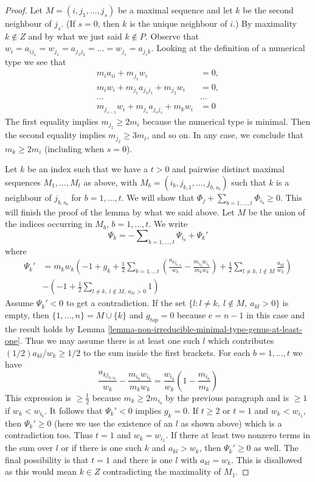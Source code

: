 \begin{proof}
\medskip\noindent
Let $M = (i, j_1, \ldots, j_s)$ be a maximal sequence and let
$k$ be the second neighbour of $j_s$. (If $s = 0$, then $k$
is the unique neighbour of $i$.) By maximality $k \not \in Z$
and by what we just said $k \not \in P$. Observe that
$w_i = a_{ij_1} = w_{j_1} = a_{j_1j_2} = \ldots = w_{j_s} =
a_{j_sk}$. Looking at the definition
of a numerical type we see that
\begin{align*}
m_ia_{ii} + m_{j_1}w_i & = 0,\\
m_iw_i + m_{j_1}a_{j_1j_1} + m_{j_2}w_i & = 0,\\
\ldots & \ldots \\
m_{j_{s - 1}}w_i + m_{j_s}a_{j_sj_s} + m_kw_i & = 0
\end{align*}
The first equality implies $m_{j_1} \geq 2m_i$ because the
numerical type is minimal. Then the second equality implies
$m_{j_2} \geq 3m_i$, and so on. In any case, we conclude that
$m_k \geq 2m_i$ (including when $s = 0$).

\medskip\noindent
Let $k$ be an index such that we have a $t > 0$ and pairwise distinct
maximal sequences $M_1, \ldots, M_t$ as above, with
$M_b = (i_b, j_{b, 1}, \ldots, j_{b, s_b})$
such that $k$ is a neighbour of $j_{b, s_b}$ for $b = 1, \ldots, t$.
We will show that $\Phi_j + \sum_{b = 1, \ldots, t} \Phi_{i_b} \geq 0$.
This will finish the proof of the lemma by what we said above.
Let $M$ be the union of the indices occurring in $M_b$, $b = 1, \ldots, t$.
We write
$$
\Psi_k =
-\sum\nolimits_{b = 1, \ldots, t} \Psi_{i_b} + \Psi_k'
$$
where
\begin{align*}
\Psi_k' & =
m_kw_k\left(-1 + g_k +
\frac{1}{2} \sum\nolimits_{b = 1, \ldots t}
(\frac{a_{kj_{b, s_b}}}{w_k} - \frac{m_{i_b}w_{i_b}}{m_kw_k}) +
\frac{1}{2} \sum\nolimits_{l \not = k,\ l \not \in M}
\frac{a_{kl}}{w_k}
\right) \\
&
-\left(
-1 + \frac{1}{2}\sum\nolimits_{l \not = k,\ l \not \in M,\ a_{kl} > 0} 1
\right)
\end{align*}
Assume $\Psi_k' < 0$ to get a contradiction.
If the set $\{l : l \not = k,\ l \not \in M,\ a_{kl} > 0\}$ is empty,
then $\{1, \ldots, n\} = M \cup \{k\}$ and $g_{top} = 0$
because $e = n - 1$ in this case and the result holds by
Lemma \ref{lemma-non-irreducible-minimal-type-genus-at-least-one}.
Thus we may assume there is at least one such $l$ which contributes
$(1/2)a_{kl}/w_k \geq 1/2$ to the sum inside the first brackets.
For each $b = 1, \ldots, t$ we have
$$
\frac{a_{kj_{b, s_b}}}{w_k} - \frac{m_{i_b}w_{i_b}}{m_kw_k} =
\frac{w_{i_b}}{w_k}(1 - \frac{m_{i_b}}{m_k})
$$
This expression is $\geq \frac{1}{2}$ because $m_k \geq 2m_{i_b}$
by the previous paragraph and is $\geq 1$ if $w_k < w_{i_b}$.
It follows that $\Psi_k' < 0$ implies $g_k = 0$.
If $t \geq 2$ or $t = 1$ and $w_k < w_{i_1}$, then $\Psi_k' \geq 0$
(here we use the existence of an $l$ as shown above) which
is a contradiction too.
Thus $t = 1$ and $w_k = w_{i_1}$. If there at least two nonzero terms
in the sum over $l$ or if there is one such $k$ and $a_{kl} > w_k$, then
$\Psi_k' \geq 0$ as well. The final possibility is that $t = 1$ and
there is one $l$ with $a_{kl} = w_k$. This is disallowed as this would
mean $k \in Z$ contradicting the maximality of $M_1$.
\end{proof}

